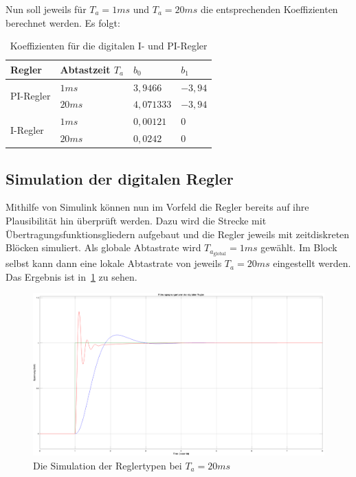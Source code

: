 \documentclass{report}
\begin{document}
Nun soll jeweils für $T_{a} = 1ms$ und $T_{a} = 20ms$ die entsprechenden Koeffizienten berechnet werden. Es folgt:

\begin{table}[!ht]
  \centering
  \begin{tabular}{|l|l|l|l|}
	\hline
	Regler & Abtastzeit $T_{a}$ & $b_{0}$ & $b_{1}$ \\
	\hline
	\multirow{2}{*}{PI-Regler} & $1ms$ & $3,9466$ & $-3,94$ \\
	\cline{2-4}
		   & $20ms$ & $4,071333$ & $-3,94$\\
	\hline
	\multirow{2}{*}{I-Regler} & $1ms$ & $0,00121$ & $0$ \\
	\cline{2-4}
	& $20ms$ & $0,0242$ & $0$\\
	\hline
  \end{tabular}
  \caption{Koeffizienten für die digitalen I- und PI-Regler}
  \label{tab:koeIPI}
\end{table}


\subsection{Simulation der digitalen Regler}
\label{sec:simul-der-digit}

Mithilfe von Simulink können nun im Vorfeld die Regler bereits auf ihre Plausibilität hin überprüft werden. Dazu wird die Strecke mit Übertragungsfunktionsgliedern aufgebaut und die Regler jeweils mit zeitdiskreten Blöcken simuliert. Als globale Abtastrate wird $T_{a_{\mathrm{global}}} = 1ms$ gewählt. Im Block selbst kann dann eine lokale Abtastrate von jeweils $T_{a} = 20ms$ eingestellt werden. Das Ergebnis ist in~\ref{fig:sim-i-pi} zu sehen.

\begin{figure}[!ht]
  \centering
  \includegraphics[width=\textwidth]{./assets/img/sim_i_pi.png}
  \caption{Die Simulation der Reglertypen bei $T_a = 20ms$ }
  \label{fig:sim-i-pi}
\end{figure}
\end{document}

